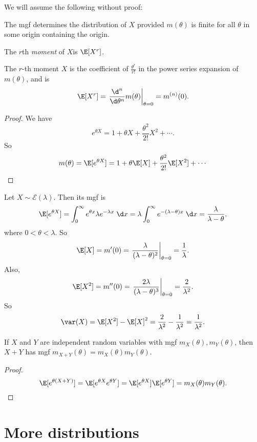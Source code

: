 \documentclass[a4paper]{article}
\begin{document}
We will assume the following without proof:
\begin{thm}
  The mgf determines the distribution of $X$ provided $m(\theta)$ is finite for all $\theta$ in some origin containing the origin.
\end{thm}

\begin{defi}[Moment]
  The $r$th \emph{moment} of $X$is $\E[X^r]$.
\end{defi}

\begin{thm}[]
  The $r$-th moment $X$ is the coefficient of $\frac{\theta^r}{r!}$ in the power series expansion of $m(\theta)$, and is
  \[
    \E[X^r] = \left.\frac{\d ^n}{\d \theta^n}m(\theta)\right|_{\theta = 0} = m^{(n)}(0).
  \]
\end{thm}

\begin{proof}
  We have
  \[
    e^{\theta X} = 1 + \theta X + \frac{\theta^2}{2!}X^2 + \cdots.
  \]
  So
  \[
    m(\theta) = \E[e^{\theta X}] = 1 + \theta \E[X] + \frac{\theta^2}{2!}\E [X^2] + \cdots
  \]
\end{proof}

\begin{eg}
  Let $X\sim \mathcal{E}(\lambda)$. Then its mgf is
  \[
    \E[e^{\theta X}] = \int_0^\infty e^{\theta x}\lambda e^{-\lambda x}\;\d x = \lambda\int_0^\infty e^{-(\lambda - \theta )x}\;\d x = \frac{\lambda}{\lambda - \theta},
  \]
  where $0 < \theta < \lambda$. So
  \[
    \E[X] = m'(0) = \left.\frac{\lambda}{(\lambda - \theta)^2}\right|_{\theta = 0} = \frac{1}{\lambda}.
  \]
  Also,
  \[
    \E[X^2] = m''(0) = \left.\frac{2\lambda}{(\lambda - \theta)^3}\right|_{\theta = 0} = \frac{2}{\lambda^2}.
  \]
  So
  \[
    \var(X) = \E[X^2] - \E[X]^2 = \frac{2}{\lambda^2} - \frac{1}{\lambda^2} = \frac{1}{\lambda^2}.
  \]
\end{eg}

\begin{thm}[]
  If $X$ and $Y$ are independent random variables with mgf $m_X(\theta), m_Y(\theta)$, then $X + Y$ has mgf $m_{X + Y}(\theta) = m_X(\theta)m_Y(\theta)$.
\end{thm}

\begin{proof}
  \[
    \E[e^{\theta(X + Y)}] = \E[e^{\theta X}e^{\theta Y}] = \E[e^{\theta X}]\E[e^{\theta Y}] = m_X(\theta)m_Y(\theta).
  \]
\end{proof}
\section{More distributions}
\end{document}
